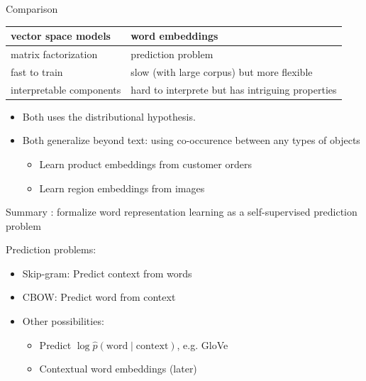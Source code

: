 \documentclass[usenames,dvipsnames,notes,11pt,aspectratio=169]{beamer}
\begin{document}
\begin{frame}
    {Comparison}
    \begin{table}
        \begin{tabular}{p{5cm}p{7cm}}
            vector space models & word embeddings \\
            \midrule
            matrix factorization & prediction problem \\
            fast to train & slow (with large corpus) but more flexible \\
            interpretable components & hard to interprete but has intriguing properties
        \end{tabular}

        \begin{itemize}
            \item Both uses the distributional hypothesis.
            \item Both generalize beyond text: using co-occurence between any types of objects
                \begin{itemize}
                    \item Learn product embeddings from customer orders
                    \item Learn region embeddings from images
                \end{itemize}
        \end{itemize}
    \end{table}
\end{frame}

\begin{frame}
    {Summary}
    : formalize word representation learning as a self-supervised prediction problem

    Prediction problems:\\
    \begin{itemize}
        \item Skip-gram: Predict context from words
        \item CBOW: Predict word from context
        \item Other possibilities:
            \begin{itemize}
                \item Predict $\log \hat{p} (\text{word}\mid \text{context})$, e.g. GloVe
                \item Contextual word embeddings (later)
            \end{itemize}
    \end{itemize}

\end{frame}
\end{document}
